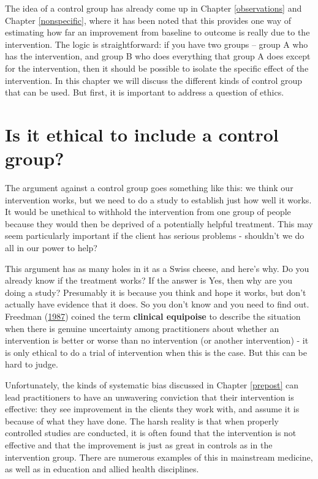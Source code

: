 \documentclass{krantz}
\begin{document}
The idea of a control group has already come up in Chapter \ref{observations} and Chapter \ref{nonspecific}, where it has been noted that this provides one way of estimating how far an improvement from baseline to outcome is really due to the intervention. The logic is straightforward: if you have two groups -- group A who has the intervention, and group B who does everything that group A does except for the intervention, then it should be possible to isolate the specific effect of the intervention. In this chapter we will discuss the different kinds of control group that can be used. But first, it is important to address a question of ethics.

\hypertarget{is-it-ethical-to-include-a-control-group}{%
\section{Is it ethical to include a control group?}\label{is-it-ethical-to-include-a-control-group}}

The argument against a control group goes something like this: we think our intervention works, but we need to do a study to establish just how well it works. It would be unethical to withhold the intervention from one group of people because they would then be deprived of a potentially helpful treatment. This may seem particularly important if the client has serious problems - shouldn't we do all in our power to help?

This argument has as many holes in it as a Swiss cheese, and here's why. Do you already know if the treatment works? If the answer is Yes, then why are you doing a study? Presumably it is because you think and hope it works, but don't actually have evidence that it does. So you don't know and you need to find out. Freedman (\protect\hyperlink{ref-freedman1987}{1987}) coined the term \textbf{clinical equipoise} to describe the situation when there is genuine uncertainty among practitioners about whether an intervention is better or worse than no intervention (or another intervention) - it is only ethical to do a trial of intervention when this is the case. But this can be hard to judge.

Unfortunately, the kinds of systematic bias discussed in Chapter \ref{prepost} can lead practitioners to have an unwavering conviction that their intervention is effective: they see improvement in the clients they work with, and assume it is because of what they have done. The harsh reality is that when properly controlled studies are conducted, it is often found that the intervention is not effective and that the improvement is just as great in controls as in the intervention group. There are numerous examples of this in mainstream medicine, as well as in education and allied health disciplines.
\end{document}
